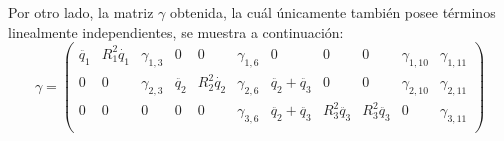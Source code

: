 \vspace{1cm}
Por otro lado, la matriz $\gamma$ obtenida, la cuál únicamente también posee términos linealmente independientes, se muestra a continuación:
			\[
\gamma=
\begin{pmatrix}
\ddot{q_1} & R_{1}^{2}\dot{q_1} & \gamma_{1,3} & 0 & 0  & \gamma_{1,6} & 0 & 0 & 0 & \gamma_{1,10} & \gamma_{1,11} \\
0 & 0 & \gamma_{2,3} & \ddot{q_2} & R_{2}^{2}\dot{q_2} & \gamma_{2,6} & \ddot{q_2} + \ddot{q_3} & 0 & 0 & \gamma_{2,10} & \gamma_{2,11} \\
0 & 0 & 0 & 0 & 0 & \gamma_{3,6} & \ddot{q_2} + \ddot{q_3} & R_{3}^{2}\ddot{q_3} & R_{3}^{2}\ddot{q_3} & 0 & \gamma_{3,11} \\
\end{pmatrix} \] \vspace{0.3cm}

